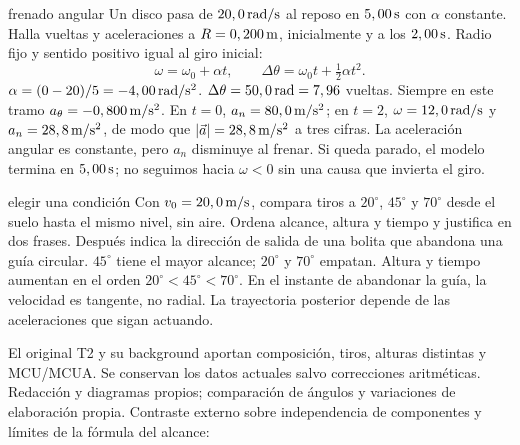 \documentclass[11pt,a4paper]{article}
\begin{document}
\begin{examplebox}{frenado angular}
 Un disco pasa de $20,0\,\mathrm{rad/s}$ al reposo en
$5,00\,\mathrm{s}$ con $\alpha$ constante. Halla vueltas y aceleraciones a
$R=0,200\,\mathrm{m}$, inicialmente y a los $2,00\,\mathrm{s}$.
\solutionblock
{} Radio fijo y sentido positivo igual al giro inicial:
\[
\omega=\omega_0+\alpha t,\qquad
\Delta\theta=\omega_0t+\tfrac12\alpha t^2.
\]
$\alpha=(0-20)/5=-4,00\,\mathrm{rad/s^2}$.
$\Delta\theta=50,0\,\mathrm{rad}=7,96$ vueltas.
Siempre en este tramo $a_\theta=-0,800\,\mathrm{m/s^2}$.
En $t=0$, $a_n=80,0\,\mathrm{m/s^2}$; en $t=2$, $\omega=12,0\,\mathrm{rad/s}$
y $a_n=28,8\,\mathrm{m/s^2}$, de modo que $|\vec a|=28,8\,\mathrm{m/s^2}$ a tres cifras.
 La aceleraci\'on angular es constante, pero $a_n$ disminuye
al frenar. Si queda parado, el modelo termina en $5,00\,\mathrm{s}$;
no seguimos hacia $\omega<0$ sin una causa que invierta el giro.
\end{examplebox}

\begin{exercisebox}{elegir una condici\'on}
Con $v_0=20,0\,\mathrm{m/s}$, compara tiros a $20^\circ$, $45^\circ$ y $70^\circ$
desde el suelo hasta el mismo nivel, sin aire. Ordena alcance, altura y tiempo
y justifica en dos frases. Despu\'es indica la direcci\'on de salida de una bolita
que abandona una gu\'ia circular.
\solutionblock
$45^\circ$ tiene el mayor alcance; $20^\circ$ y $70^\circ$ empatan.
Altura y tiempo aumentan en el orden $20^\circ<45^\circ<70^\circ$.
En el instante de abandonar la gu\'ia, la velocidad es tangente, no radial.
La trayectoria posterior depende de las aceleraciones que sigan actuando.
\end{exercisebox}

El original T2 y su background aportan composici\'on, tiros, alturas distintas y
MCU/MCUA. Se conservan los datos actuales salvo correcciones aritm\'eticas.
Redacci\'on y diagramas propios; comparaci\'on de \'angulos y variaciones de elaboraci\'on propia.
Contraste externo sobre independencia de componentes y l\'imites de la f\'ormula del alcance:
\end{document}
